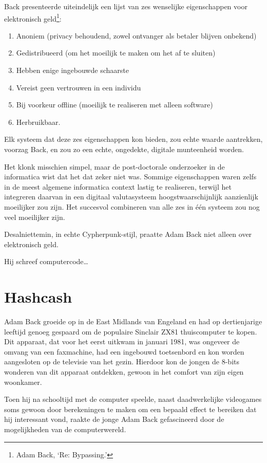 \documentclass[smalldemyvopaper,11pt,twoside,onecolumn,openright,extrafontsizes,hidelinks]{memoir}
\begin{document}
Back presenteerde uiteindelijk een lijst van zes wenselijke
eigenschappen voor elektronisch geld\footnote{Adam Back, `Re:
  Bypassing.'}:

\begin{enumerate}
\def\labelenumi{\arabic{enumi}.}
\tightlist
\item
  Anoniem (privacy behoudend, zowel ontvanger als betaler blijven
  onbekend)
\item
  Gedistribueerd (om het moeilijk te maken om het af te sluiten)
\item
  Hebben enige ingebouwde schaarste
\item
  Vereist geen vertrouwen in een individu
\item
  Bij voorkeur offline (moeilijk te realiseren met alleen software)
\item
  Herbruikbaar.
\end{enumerate}

Elk systeem dat deze zes eigenschappen kon bieden, zou echte waarde
aantrekken, voorzag Back, en zou zo een echte, ongedekte, digitale
munteenheid worden.

Het klonk misschien simpel, maar de post-doctorale onderzoeker in de
informatica wist dat het dat zeker niet was. Sommige eigenschappen waren
zelfs in de meest algemene informatica context lastig te realiseren,
terwijl het integreren daarvan in een digitaal valutasysteem
hoogstwaarschijnlijk aanzienlijk moeilijker zou zijn. Het succesvol
combineren van alle zes in één systeem zou nog veel moeilijker zijn.

Desalniettemin, in echte Cypherpunk-stijl, praatte Adam Back niet alleen
over elektronisch geld.

Hij schreef computercode\ldots{}

\chapter{Hashcash}\label{hashcash}

Adam Back groeide op in de East Midlands van Engeland en had op
dertienjarige leeftijd genoeg gespaard om de populaire Sinclair ZX81
thuiscomputer te kopen. Dit apparaat, dat voor het eerst uitkwam in
januari 1981, was ongeveer de omvang van een faxmachine, had een
ingebouwd toetsenbord en kon worden aangesloten op de televisie van het
gezin. Hierdoor kon de jongen de 8-bits wonderen van dit apparaat
ontdekken, gewoon in het comfort van zijn eigen woonkamer.

Toen hij na schooltijd met de computer speelde, naast daadwerkelijke
videogames soms gewoon door berekeningen te maken om een bepaald effect
te bereiken dat hij interessant vond, raakte de jonge Adam Back
gefascineerd door de mogelijkheden van de computerwereld.
\end{document}
